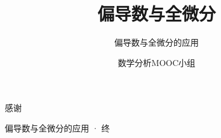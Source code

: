 \documentclass[xetex]{beamer}
\title{偏导数与全微分}
\subtitle{偏导数与全微分的应用}
\author{数学分析MOOC小组}
\date{}
\begin{document}
    \frame{\maketitle}

    
    
    
    

    \begin{frame}[standout]

        感谢

        \small{偏导数与全微分的应用 · 终}
    
    \end{frame}
\end{document}
